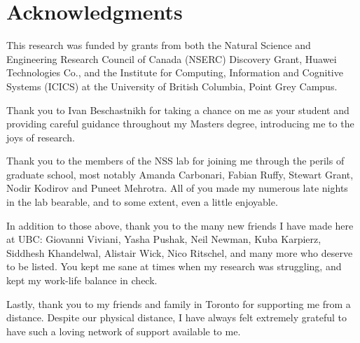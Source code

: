 
\chapter{Acknowledgments}

This research was funded by grants from both the Natural Science and
Engineering Research Council of Canada (NSERC) Discovery Grant, Huawei
Technologies Co., and the Institute for Computing, Information and
Cognitive Systems (ICICS) at the University of British Columbia, Point
Grey Campus.

Thank you to Ivan Beschastnikh for taking a chance on me as your
student and providing careful guidance throughout my Masters degree,
introducing me to the joys of research.

Thank you to the members of the NSS lab for joining me through the
perils of graduate school, most notably Amanda Carbonari, Fabian
Ruffy, Stewart Grant, Nodir Kodirov and Puneet Mehrotra. All of you
made my numerous late nights in the lab bearable, and to some extent,
even a little enjoyable.

In addition to those above, thank you to the many new friends I have
made here at UBC: Giovanni Viviani, Yasha Pushak, Neil Newman, Kuba
Karpierz, Siddhesh Khandelwal, Alistair Wick, Nico Ritschel, and many
more who deserve to be listed. You kept me sane at times when my
research was struggling, and kept my work-life balance in check.

Lastly, thank you to my friends and family in Toronto for supporting
me from a distance. Despite our physical distance, I have always felt
extremely grateful to have such a loving network of support available
to me.
